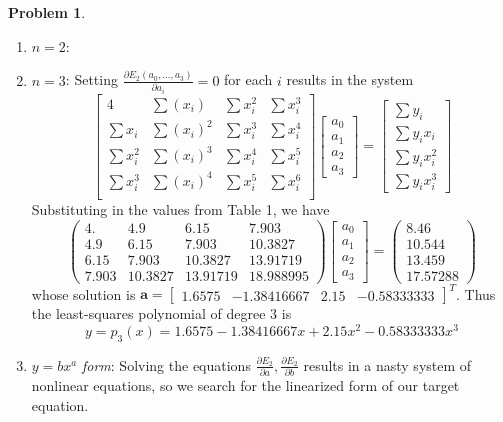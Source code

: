 \documentclass[10pt]{article}
\theoremstyle{plain}
\theoremstyle{definition}
\newtheorem{prob}{Problem}
\numberwithin{equation}{section}
\begin{document}
\begin{prob}
\begin{enumerate}[\bfseries(a)]
\item $n=2$: 
\item $n=3$:
    Setting $\frac{\partial E_2(a_0, \ldots , a_3)}{\partial a_i} = 0$ for each $i$
    results in the system
\[
\begin{bmatrix}
    4          & \sum (x_i)   & \sum x_i^2 & \sum x_i^3 \\
    \sum x_i   & \sum (x_i)^2 & \sum x_i^3 & \sum x_i^4 \\
    \sum x_i^2 & \sum (x_i)^3 & \sum x_i^4 & \sum x_i^5 \\
    \sum x_i^3 & \sum (x_i)^4 & \sum x_i^5 & \sum x_i^6 \\
\end{bmatrix}
\begin{bmatrix} a_0 \\ a_1 \\ a_2 \\ a_3 \end{bmatrix}
=
\begin{bmatrix} \sum y_i \\ \sum y_i x_i \\ \sum y_i x_i^2 \\ \sum y_i x_i^3 \end{bmatrix}
\]
Substituting in the values from Table 1, we have
\[
\begin{pmatrix}
4.      &   4.9     &   6.15    &   7.903   \\
4.9     &   6.15    &   7.903   &  10.3827  \\
6.15    &   7.903   &  10.3827  &  13.91719 \\
7.903   &  10.3827  &  13.91719 &  18.988995
\end{pmatrix}
\begin{bmatrix} a_0 \\ a_1 \\ a_2 \\ a_3 \end{bmatrix}
= \begin{pmatrix} 8.46    \\ 10.544   \\ 13.459   \\ 17.57288 \end{pmatrix}
\]
whose solution is
$\bm{a} = \begin{bmatrix} 1.6575 & -1.38416667 & 2.15 & -0.58333333 \end{bmatrix}^T$. Thus
the least-squares polynomial of degree 3 is
\[
        y = p_3(x) = 1.6575  - 1.38416667 x + 2.15 x^2  - 0.58333333 x^3
\]

\item   $y= bx^a$ \textit{form}:
    Solving the equations $\frac{\partial E_2}{\partial a} , \frac{\partial E_2}{\partial b}$
    results in a nasty system of nonlinear equations, so we search for the
    linearized form of our target equation.
\end{enumerate}
\end{prob}
\end{document}
